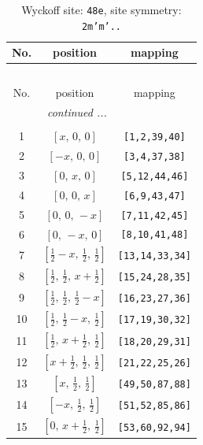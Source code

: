 \documentclass[fleqn,8pt]{jsarticle}
\begin{document}
\begin{longtable}{ccc}
\caption{Wyckoff site: {\tt 48e}, site symmetry: {\tt 2m'm'..}}
 \\
 \hline \hline
No. & position & mapping \\ \hline \endfirsthead

\multicolumn{2}{l}{\tablename\ \thetable{}} \\
 \hline \hline
No. & position & mapping \\ \hline \endhead

 \hline \hline
\multicolumn{2}{r}{\footnotesize\it continued ...} \\ \endfoot

 \hline \hline
\multicolumn{2}{r}{} \\ \endlastfoot

1 & $\left[ x,\, 0,\, 0 \right]$ & {\tt [1,2,39,40]} \\ \hline
2 & $\left[ - x,\, 0,\, 0 \right]$ & {\tt [3,4,37,38]} \\ \hline
3 & $\left[ 0,\, x,\, 0 \right]$ & {\tt [5,12,44,46]} \\ \hline
4 & $\left[ 0,\, 0,\, x \right]$ & {\tt [6,9,43,47]} \\ \hline
5 & $\left[ 0,\, 0,\, - x \right]$ & {\tt [7,11,42,45]} \\ \hline
6 & $\left[ 0,\, - x,\, 0 \right]$ & {\tt [8,10,41,48]} \\ \hline
7 & $\left[ \frac{1}{2} - x,\, \frac{1}{2},\, \frac{1}{2} \right]$ & {\tt [13,14,33,34]} \\ \hline
8 & $\left[ \frac{1}{2},\, \frac{1}{2},\, x + \frac{1}{2} \right]$ & {\tt [15,24,28,35]} \\ \hline
9 & $\left[ \frac{1}{2},\, \frac{1}{2},\, \frac{1}{2} - x \right]$ & {\tt [16,23,27,36]} \\ \hline
10 & $\left[ \frac{1}{2},\, \frac{1}{2} - x,\, \frac{1}{2} \right]$ & {\tt [17,19,30,32]} \\ \hline
11 & $\left[ \frac{1}{2},\, x + \frac{1}{2},\, \frac{1}{2} \right]$ & {\tt [18,20,29,31]} \\ \hline
12 & $\left[ x + \frac{1}{2},\, \frac{1}{2},\, \frac{1}{2} \right]$ & {\tt [21,22,25,26]} \\ \hline
13 & $\left[ x,\, \frac{1}{2},\, \frac{1}{2} \right]$ & {\tt [49,50,87,88]} \\ \hline
14 & $\left[ - x,\, \frac{1}{2},\, \frac{1}{2} \right]$ & {\tt [51,52,85,86]} \\ \hline
15 & $\left[ 0,\, x + \frac{1}{2},\, \frac{1}{2} \right]$ & {\tt [53,60,92,94]} \\ \hline

\end{longtable}
\end{document}
